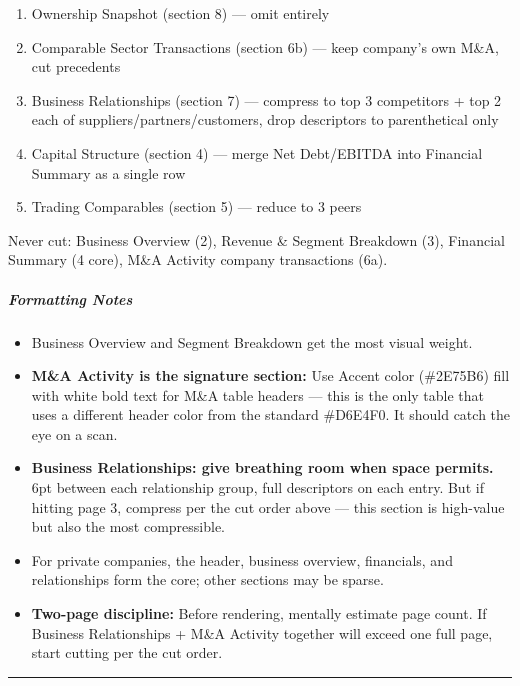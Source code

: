 \documentclass[11pt]{article}
\begin{document}
\begin{enumerate}[leftmargin=*,itemsep=2pt,topsep=2pt]
\item {} Ownership Snapshot (section 8) — omit entirely
\item {} Comparable Sector Transactions (section 6b) — keep company's own M\&A, cut precedents
\item {} Business Relationships (section 7) — compress to top 3 competitors + top 2 each of suppliers/partners/customers, drop descriptors to parenthetical only
\item {} Capital Structure (section 4) — merge Net Debt/EBITDA into Financial Summary as a single row
\item {} Trading Comparables (section 5) — reduce to 3 peers
\end{enumerate}

Never cut: Business Overview (2), Revenue \& Segment Breakdown (3), Financial Summary (4 core), M\&A Activity company transactions (6a).


\subparagraph{Formatting Notes}\mbox{}\par
\begin{itemize}[leftmargin=*,itemsep=2pt,topsep=2pt]
\item {} Business Overview and Segment Breakdown get the most visual weight.
\item {} \textbf{M\&A Activity is the signature section:} Use Accent color (\#2E75B6) fill with white bold text for M\&A table headers — this is the only table that uses a different header color from the standard \#D6E4F0. It should catch the eye on a scan.
\item {} \textbf{Business Relationships: give breathing room when space permits.} 6pt between each relationship group, full descriptors on each entry. But if hitting page 3, compress per the cut order above — this section is high-value but also the most compressible.
\item {} For private companies, the header, business overview, financials, and relationships form the core; other sections may be sparse.
\item {} \textbf{Two-page discipline:} Before rendering, mentally estimate page count. If Business Relationships + M\&A Activity together will exceed one full page, start cutting per the cut order.
\end{itemize}

\vspace{0.8em}\hrule\vspace{0.8em}
\end{document}
